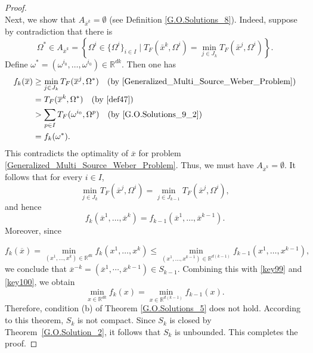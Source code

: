 \documentclass[sn-mathphys-num]{sn-jnl}%
\theoremstyle{definition}
\begin{document}
\begin{proof}
\begin{equation}
	\end{equation}
	Next, we show that $A_{\overline{x}^k}=\emptyset$ (see Definition \ref{G.O.Solutions_8}). Indeed, suppose by contradiction that there is 
    \begin{equation}\label{def47}
            \Omega^* \in A_{\overline{x}^k}=\left\{\Omega^i \in \{\Omega^i\}_{i \in I}\mid
	T_F(\bar x^k,\Omega^i)=\min_{j \in J_k}T_F(\bar x^j,\Omega^i)\right\}.
    \end{equation}
   Define \(\omega^*=(\omega^{i_0},\dots,\omega^{i_0})\in\mathbb{R}^{dk}\). Then one has
	\[
	\begin{aligned}
		f_k(\overline{x})&\geq \min_{j \in J_k}T_F(\overline{x}^j,\Omega^*)\quad(\text{by \eqref{Generalized_Multi_Source_Weber_Problem}})\\
		&=T_F(\overline{x}^k,\Omega^*)\quad(\text{by \ref{def47}})\\
		&>\sum_{p \in I}T_F(\omega^{i_0},\Omega^p)\quad(\text{by~\eqref{G.O.Solutions_9_2}})\\
		&=f_k(\omega^*).
	\end{aligned}
	\]
	This contradicts the optimality of $\overline{x}$ for problem \eqref{Generalized_Multi_Source_Weber_Problem}.
	Thus, we must have $A_{\overline{x}^k} = \emptyset$. It follows that for every $i\in I$,
	\[
	\min_{j \in J_k}T_F(\overline{x}^j,\Omega^i)=\min_{j\in J_{k-1}}T_F(\overline{x}^j,\Omega^i),\]
	and hence
	\begin{equation}\label{key99}
		f_{k}(\overline{x}^1,\dots,\overline{x}^k)=f_{k-1}(\overline{x}^1,\dots,\overline{x}^{k-1}).
	\end{equation}
	Moreover, since
	
	\begin{equation}\label{key100}
		f_k(\overline{x})=\min_{(x^1,\dots,x^k)\in \mathbb{R}^{dk}} f_k\left(x^1,\dots,x^k \right)
		\leq
		\min_{(x^1,\dots,x^{k-1})\in \mathbb{R}^{d(k-1)}} f_{k-1}\left(x^1,\dots,x^{k-1} \right),
	\end{equation}
	we conclude that $\overline{x}^{-k}=(\overline{x}^1,\cdots,\overline{x}^{k-1})\in S_{k-1}.$ Combining this with \eqref{key99} and \eqref{key100}, we obtain
	\[
	\min_{x \in \mathbb{R}^{dk}} f_k(x)=\min_{x \in \mathbb{R}^{d(k-1)}} f_{k-1}(x).
	\]
	Therefore, condition (b) of Theorem \ref{G.O.Solutions_5} does not hold. According to this theorem, $S_k$ is not compact. Since $S_k$ is closed by Theorem~\ref{G.O.Solution_2}, it follows that $S_k$ is unbounded. This completes the proof.
\end{proof}
\end{document}
